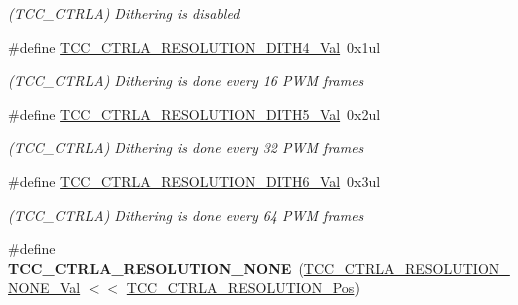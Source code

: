 \begin{DoxyCompactItemize}
\begin{DoxyCompactList}\small\item\em (T\+C\+C\+\_\+\+C\+T\+R\+L\+A) Dithering is disabled \end{DoxyCompactList}\item 
\hypertarget{group___s_a_m_l21___t_c_c_gafc06d15e640e4ce043901b2df809f393}{}\#define \hyperlink{group___s_a_m_l21___t_c_c_gafc06d15e640e4ce043901b2df809f393}{T\+C\+C\+\_\+\+C\+T\+R\+L\+A\+\_\+\+R\+E\+S\+O\+L\+U\+T\+I\+O\+N\+\_\+\+D\+I\+T\+H4\+\_\+\+Val}~0x1ul\label{group___s_a_m_l21___t_c_c_gafc06d15e640e4ce043901b2df809f393}

\begin{DoxyCompactList}\small\item\em (T\+C\+C\+\_\+\+C\+T\+R\+L\+A) Dithering is done every 16 P\+W\+M frames \end{DoxyCompactList}\item 
\hypertarget{group___s_a_m_l21___t_c_c_ga75ab113184814bd3c94ff8593965e2c4}{}\#define \hyperlink{group___s_a_m_l21___t_c_c_ga75ab113184814bd3c94ff8593965e2c4}{T\+C\+C\+\_\+\+C\+T\+R\+L\+A\+\_\+\+R\+E\+S\+O\+L\+U\+T\+I\+O\+N\+\_\+\+D\+I\+T\+H5\+\_\+\+Val}~0x2ul\label{group___s_a_m_l21___t_c_c_ga75ab113184814bd3c94ff8593965e2c4}

\begin{DoxyCompactList}\small\item\em (T\+C\+C\+\_\+\+C\+T\+R\+L\+A) Dithering is done every 32 P\+W\+M frames \end{DoxyCompactList}\item 
\hypertarget{group___s_a_m_l21___t_c_c_gafb54b3d1509f6c3aab88130b33862b6c}{}\#define \hyperlink{group___s_a_m_l21___t_c_c_gafb54b3d1509f6c3aab88130b33862b6c}{T\+C\+C\+\_\+\+C\+T\+R\+L\+A\+\_\+\+R\+E\+S\+O\+L\+U\+T\+I\+O\+N\+\_\+\+D\+I\+T\+H6\+\_\+\+Val}~0x3ul\label{group___s_a_m_l21___t_c_c_gafb54b3d1509f6c3aab88130b33862b6c}

\begin{DoxyCompactList}\small\item\em (T\+C\+C\+\_\+\+C\+T\+R\+L\+A) Dithering is done every 64 P\+W\+M frames \end{DoxyCompactList}\item 
\hypertarget{group___s_a_m_l21___t_c_c_ga4741fc6642df841192144193bbe8a275}{}\#define {\bfseries T\+C\+C\+\_\+\+C\+T\+R\+L\+A\+\_\+\+R\+E\+S\+O\+L\+U\+T\+I\+O\+N\+\_\+\+N\+O\+N\+E}~(\hyperlink{group___s_a_m_l21___t_c_c_gab80a187329f0ba797f179c605e3c109a}{T\+C\+C\+\_\+\+C\+T\+R\+L\+A\+\_\+\+R\+E\+S\+O\+L\+U\+T\+I\+O\+N\+\_\+\+N\+O\+N\+E\+\_\+\+Val} $<$$<$ \hyperlink{group___s_a_m_l21___t_c_c_gaae5fd9846d9468fd2d0bbf8748e2a39b}{T\+C\+C\+\_\+\+C\+T\+R\+L\+A\+\_\+\+R\+E\+S\+O\+L\+U\+T\+I\+O\+N\+\_\+\+Pos})\label{group___s_a_m_l21___t_c_c_ga4741fc6642df841192144193bbe8a275}


\end{DoxyCompactItemize}

